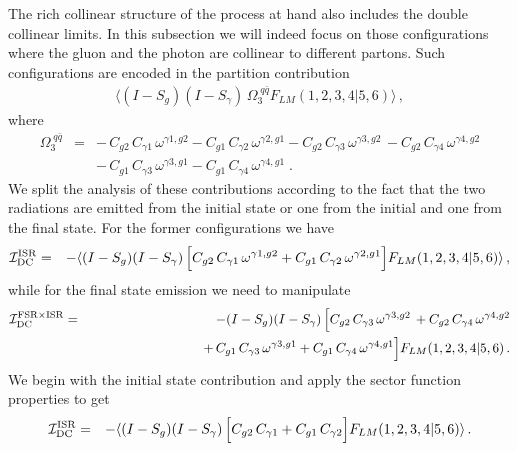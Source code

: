 \documentclass[12pt,a4paper]{article}
\newcommand{\nn}{\nonumber}
\newcommand{\beq}{\begin{eqnarray}}
\newcommand{\eeq}{\end{eqnarray}}
\begin{document}
The rich collinear structure of the process at hand also includes the double collinear limits. In this subsection we will indeed focus on those configurations where the gluon and the photon are collinear to different partons. Such configurations are encoded in the partition contribution
\beq
 \langle (I-S_g) (I-S_\gamma)   \, 
\Omega^{\; q\bar{q}}_3 
F_{LM}(1,2,3,4|5,6)\rangle \, , 
\eeq
where
\beq
\Omega^{\; q\bar{q}}_3 &=& 
-  \, C_{g2} \, C_{\gamma1}  \, \omega^{\gamma1,g2}
-  C_{g1} \, C_{\gamma2} \,  \omega^{\gamma2,g1}
-  C_{g2} \, C_{\gamma3} \,  \omega^{\gamma3,g2} \, 
-  C_{g2}\, C_{\gamma4} \,  \omega^{\gamma4,g2}
\nn \\
&&
- \, C_{g1} \, C_{\gamma3}  \, \omega^{\gamma3,g1} 
-  C_{g1} \, C_{\gamma4} \,  \omega^{\gamma4,g1} \; .
\eeq
We split the analysis of these contributions according to the fact that the two radiations are emitted from the initial state or one from the initial and one from the final state.
For the former configurations we have
\beq
\mathcal{I}_{\rm DC}^{\rm ISR} &=& 
-
\langle (I-S_g) (I-S_\gamma)   \, 
\Big[
C_{g2} \, C_{\gamma1}  \, \omega^{\gamma1,g2}
+  C_{g1} \, C_{\gamma2} \,  \omega^{\gamma2,g1}
\Big]
F_{LM}(1,2,3,4|5,6)\rangle \, ,
\eeq
while for the final state emission we need to manipulate
\beq
\mathcal{I}_{\rm DC}^{\rm FSR\times ISR} 
&=& 
-
(I-S_g) (I-S_\gamma)   \, 
\Big[
C_{g2} \, C_{\gamma3} \,  \omega^{\gamma3,g2} \, 
+  C_{g2}\, C_{\gamma4} \,  \omega^{\gamma4,g2}
\nn \\
&& \hspace{3cm}
+\, C_{g1} \, C_{\gamma3}  \, \omega^{\gamma3,g1} 
+ C_{g1} \, C_{\gamma4} \,  \omega^{\gamma4,g1} \Big]
F_{LM}(1,2,3,4|5,6) \, .
\eeq
We begin with the initial state contribution and apply the sector function properties to get
\beq
\mathcal{I}_{\rm DC}^{\rm ISR} &=& 
-
\langle (I-S_g) (I-S_\gamma)   \, 
\Big[
C_{g2} \, C_{\gamma1}  
+  C_{g1} \, C_{\gamma2} 
\Big]
F_{LM}(1,2,3,4|5,6)\rangle \, .
\eeq
\end{document}
